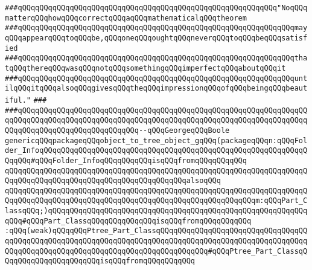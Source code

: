 \verb|###qQQqqQQqqQQqqQQqqQQqqQQqqQQqqQQqqQQqqQQqqQQqqQQqqQQqqQQqqQQq"NoqQQqmatterqQQqhowqQQqcorrectqQQqaqQQqmathematicalqQQqtheorem|\newline
\verb|###qQQqqQQqqQQqqQQqqQQqqQQqqQQqqQQqqQQqqQQqqQQqqQQqqQQqqQQqqQQqqQQqmayqQQqappearqQQqtoqQQqbe,qQQqoneqQQqoughtqQQqneverqQQqtoqQQqbeqQQqsatisfied|\newline
\verb|###qQQqqQQqqQQqqQQqqQQqqQQqqQQqqQQqqQQqqQQqqQQqqQQqqQQqqQQqqQQqqQQqthatqQQqthereqQQqwasqQQqnotqQQqsomethingqQQqimperfectqQQqaboutqQQqit|\newline
\verb|###qQQqqQQqqQQqqQQqqQQqqQQqqQQqqQQqqQQqqQQqqQQqqQQqqQQqqQQqqQQqqQQquntilqQQqitqQQqalsoqQQqgivesqQQqtheqQQqimpressionqQQqofqQQqbeingqQQqbeautiful."|\newline
\verb|###|\newline
\verb|###qQQqqQQqqQQqqQQqqQQqqQQqqQQqqQQqqQQqqQQqqQQqqQQqqQQqqQQqqQQqqQQqqQQqqQQqqQQqqQQqqQQqqQQqqQQqqQQqqQQqqQQqqQQqqQQqqQQqqQQqqQQqqQQqqQQqqQQqqQQqqQQqqQQqqQQqqQQqqQQqqQQqqQQq--qQQqGeorgeqQQqBoole|\newline
\newline
\newline
\newline
\verb|genericqQQqpackageqQQqobject_to_tree_object_gqQQq(packageqQQqn:qQQqFolder_InfoqQQqqQQqqQQqqQQqqQQqqQQqqQQqqQQqqQQqqQQqqQQqqQQqqQQqqQQqqQQqqQQqqQQq#qQQqFolder_InfoqQQqqQQqqQQqisqQQqfromqQQqqQQqqQQq|\newline
\verb|qQQqqQQqqQQqqQQqqQQqqQQqqQQqqQQqqQQqqQQqqQQqqQQqqQQqqQQqqQQqqQQqqQQqqQQqqQQqqQQqqQQqqQQqqQQqqQQqqQQqqQQqqQQqqQQqalsoqQQq|\newline
\verb|qQQqqQQqqQQqqQQqqQQqqQQqqQQqqQQqqQQqqQQqqQQqqQQqqQQqqQQqqQQqqQQqqQQqqQQqqQQqqQQqqQQqqQQqqQQqqQQqqQQqqQQqqQQqqQQqqQQqqQQqqQQqqQQqm:qQQqPart_ClassqQQq;)qQQqqQQqqQQqqQQqqQQqqQQqqQQqqQQqqQQqqQQqqQQqqQQqqQQqqQQqqQQqqQQq#qQQqPart_ClassqQQqqQQqqQQqqQQqisqQQqfromqQQqqQQqqQQq|\newline
\newline
\verb|:qQQq(weak)qQQqqQQqPtree_Part_ClassqQQqqQQqqQQqqQQqqQQqqQQqqQQqqQQqqQQqqQQqqQQqqQQqqQQqqQQqqQQqqQQqqQQqqQQqqQQqqQQqqQQqqQQqqQQqqQQqqQQqqQQqqQQqqQQqqQQqqQQqqQQqqQQqqQQqqQQqqQQqqQQqqQQqqQQq#qQQqPtree_Part_ClassqQQqqQQqqQQqqQQqqQQqqQQqisqQQqfromqQQqqQQqqQQq|\newline
